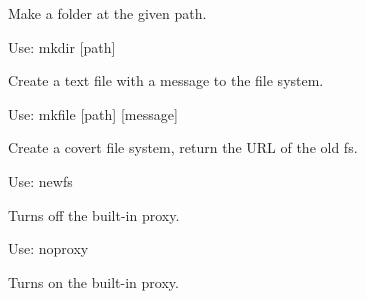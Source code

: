 \documentclass[letterpaper,12pt,openany,oneside]{sphinxmanual}
\begin{document}
\begin{fulllineitems}

\begin{fulllineitems}
\label{main:main.Console.do_mkdir}
Make a folder at the given path.

Use: mkdir {[}path{]}

\end{fulllineitems}


\begin{fulllineitems}
\label{main:main.Console.do_mkfile}
Create a text file with a message to the file system.

Use: mkfile {[}path{]} {[}message{]}

\end{fulllineitems}


\begin{fulllineitems}
\label{main:main.Console.do_mount}
\end{fulllineitems}


\begin{fulllineitems}
\label{main:main.Console.do_newfs}
Create a covert file system, return the URL of the old fs.

Use: newfs

\end{fulllineitems}


\begin{fulllineitems}
\label{main:main.Console.do_noproxy}
Turns off the built-in proxy.

Use: noproxy

\end{fulllineitems}


\begin{fulllineitems}
\label{main:main.Console.do_proxy}
Turns on the built-in proxy.


\end{fulllineitems}
\end{fulllineitems}
\end{document}
